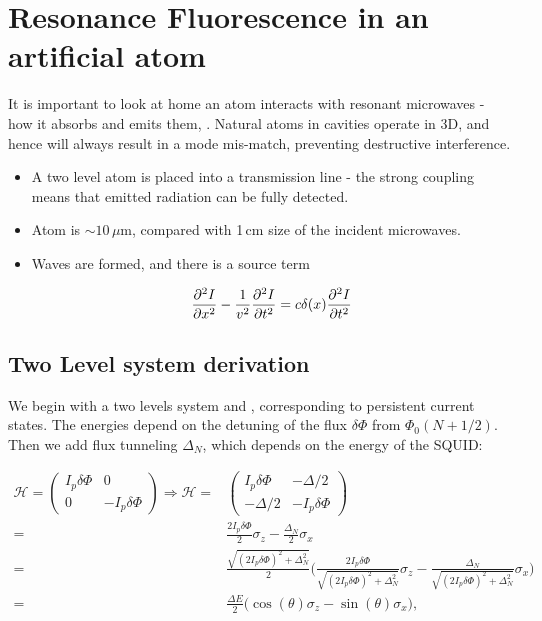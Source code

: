 \section{Resonance Fluorescence in an artificial atom\label{sec:resonanceFluorescence}}
 
 It is important to look at home an atom interacts with resonant microwaves - how it absorbs and emits them, . Natural atoms in cavities operate in 3D, and hence will always result in a mode mis-match, preventing destructive interference.
 
 \begin{itemize}
 	\item A two level atom is placed into a transmission line - the strong coupling means that emitted radiation can be fully detected.
 	\item Atom is $ \sim 10\,\mu$m, compared with 1\,cm size of the incident microwaves.
 	\item Waves are formed, and there is a source term
 	
 	\begin{equation}\label{key}
 		 \frac{\partial^2I}{\partial x^2} - \frac{1}{v^2} \frac{\partial^2I}{\partial t^2} = c\delta(x) \frac{\partial^2I}{\partial t^2}
 	\end{equation}
 \end{itemize}

 

 \subsection{Two Level system derivation\label{subsec:twoLevelDerivation}}
We begin with a two levels system  and , corresponding to persistent current states. The energies depend on the detuning of the flux $ \delta\Phi $ from $ \Phi_0(N+1/2) $. Then we add flux tunneling $ \Delta_N $, which depends on the energy of the SQUID:

\[ \begin{aligned}
\mathcal{H} = \begin{pmatrix}
I_p\delta\Phi & 0 \\ 0 & -I_p\delta\Phi
\end{pmatrix} \Rightarrow
\mathcal{H} = & \begin{pmatrix}
I_p\delta\Phi & -\Delta/2\\-\Delta/2 & -I_p\delta\Phi
\end{pmatrix}\\
= & \frac{2I_p\delta\Phi}{2}\sigma_z - \frac{\Delta_N}{2}\sigma_x\\
= & \frac{\sqrt{(2I_p\delta\Phi)^2+\Delta_N^2}}{2}\bigg(\frac{2I_p\delta\Phi}{\sqrt{(2I_p\delta\Phi)^2+\Delta_N^2}}\sigma_z - \frac{\Delta_N}{\sqrt{(2I_p\delta\Phi)^2+\Delta_N^2}}\sigma_x\bigg)\\
= & \frac{\Delta E}{2}\big(\cos(\theta)\sigma_z - \sin(\theta)\sigma_x\big),
\end{aligned}
\]

